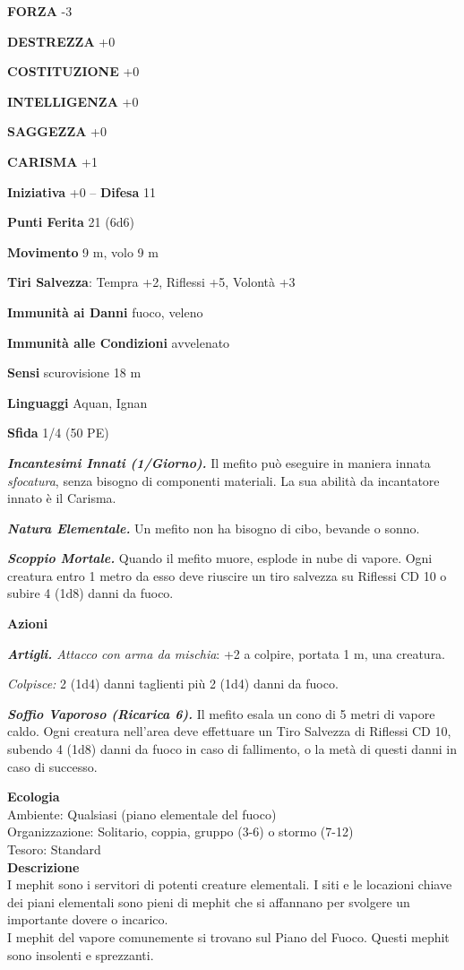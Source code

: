 \begin{multicols}{2}
\textbf{FORZA} -3

\textbf{DESTREZZA} +0

\textbf{COSTITUZIONE} +0

\textbf{INTELLIGENZA} +0

\textbf{SAGGEZZA} +0

\textbf{CARISMA} +1

\textbf{Iniziativa} +0 -- \textbf{Difesa} 11

\textbf{Punti Ferita} 21 (6d6)

\textbf{Movimento} 9 m, volo 9 m

\textbf{Tiri Salvezza}: Tempra +2, Riflessi +5, Volontà +3

\textbf{Immunità ai Danni} fuoco, veleno

\textbf{Immunità alle Condizioni} avvelenato

\textbf{Sensi} scurovisione 18 m

\textbf{Linguaggi} Aquan, Ignan

\textbf{Sfida} 1/4 (50 PE)

\emph{\textbf{Incantesimi Innati (1/Giorno).}} Il mefito può eseguire in maniera innata \emph{sfocatura}, senza bisogno di componenti materiali. La sua abilità da incantatore innato è il Carisma.

\emph{\textbf{Natura Elementale.}} Un mefito non ha bisogno di cibo,
bevande o sonno.

\emph{\textbf{Scoppio Mortale.}} Quando il mefito muore, esplode in nube
di vapore. Ogni creatura entro 1 metro da esso deve riuscire un tiro
salvezza su Riflessi CD 10 o subire 4 (1d8) danni da fuoco.

\textbf{Azioni}

\emph{\textbf{Artigli.} Attacco con arma da mischia}: +2 a colpire,
portata 1 m, una creatura.

\emph{Colpisce:} 2 (1d4) danni taglienti più 2 (1d4) danni da fuoco.

\emph{\textbf{Soffio Vaporoso (Ricarica 6).}} Il mefito esala un cono di 5 metri di vapore caldo. Ogni creatura nell'area deve effettuare un Tiro Salvezza di Riflessi CD 10, subendo 4 (1d8) danni da fuoco in caso di fallimento, o la metà di questi danni in caso di successo.

\textbf{Ecologia}\\
Ambiente: Qualsiasi (piano elementale del fuoco)\\
Organizzazione: Solitario, coppia, gruppo (3-6) o stormo (7-12)\\
Tesoro: Standard\\
\textbf{Descrizione}\\
I mephit sono i servitori di potenti creature elementali. I siti e le locazioni chiave dei piani elementali sono pieni di mephit che si affannano per svolgere un importante dovere o incarico.\\
I mephit del vapore comunemente si trovano sul Piano del Fuoco. Questi mephit sono insolenti e sprezzanti.\\




\end{multicols}
